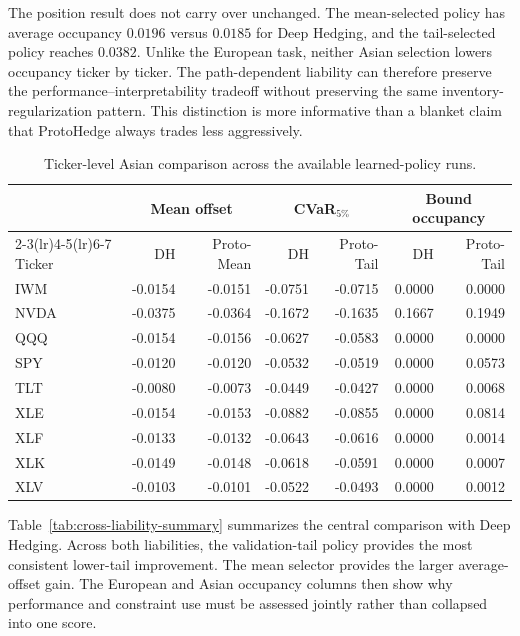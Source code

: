 \documentclass[sigconf]{acmart}
\begin{document}
The position result does not carry over unchanged. The mean-selected policy
has average occupancy $0.0196$ versus $0.0185$ for Deep Hedging, and the
tail-selected policy reaches $0.0382$. Unlike the European task, neither Asian
selection lowers occupancy ticker by ticker. The path-dependent liability can
therefore preserve the performance--interpretability tradeoff without
preserving the same inventory-regularization pattern. This distinction is more
informative than a blanket claim that ProtoHedge always trades less
aggressively.

\begin{table}[t]
\centering
\small
\setlength{\tabcolsep}{4.5pt}
\begin{tabular}{lrrrrrr}
\toprule
& \multicolumn{2}{c}{Mean offset} & \multicolumn{2}{c}{CVaR$_{5\%}$} &
\multicolumn{2}{c}{Bound occupancy} \\
\cmidrule(lr){2-3}\cmidrule(lr){4-5}\cmidrule(lr){6-7}
Ticker & DH & Proto-Mean & DH & Proto-Tail & DH & Proto-Tail \\
\midrule
IWM  & -0.0154 & -0.0151 & -0.0751 & -0.0715 & 0.0000 & 0.0000 \\
NVDA & -0.0375 & -0.0364 & -0.1672 & -0.1635 & 0.1667 & 0.1949 \\
QQQ  & -0.0154 & -0.0156 & -0.0627 & -0.0583 & 0.0000 & 0.0000 \\
SPY  & -0.0120 & -0.0120 & -0.0532 & -0.0519 & 0.0000 & 0.0573 \\
TLT  & -0.0080 & -0.0073 & -0.0449 & -0.0427 & 0.0000 & 0.0068 \\
XLE  & -0.0154 & -0.0153 & -0.0882 & -0.0855 & 0.0000 & 0.0814 \\
XLF  & -0.0133 & -0.0132 & -0.0643 & -0.0616 & 0.0000 & 0.0014 \\
XLK  & -0.0149 & -0.0148 & -0.0618 & -0.0591 & 0.0000 & 0.0007 \\
XLV  & -0.0103 & -0.0101 & -0.0522 & -0.0493 & 0.0000 & 0.0012 \\
\bottomrule
\end{tabular}
\caption{Ticker-level Asian comparison across the available learned-policy
runs.}
\label{tab:asian-ticker}
\end{table}

Table~\ref{tab:cross-liability-summary} summarizes the central comparison with
Deep Hedging. Across both liabilities, the validation-tail policy provides the
most consistent lower-tail improvement. The mean selector provides the larger
average-offset gain. The European and Asian occupancy columns then show why
performance and constraint use must be assessed jointly rather than collapsed
into one score.
\end{document}
